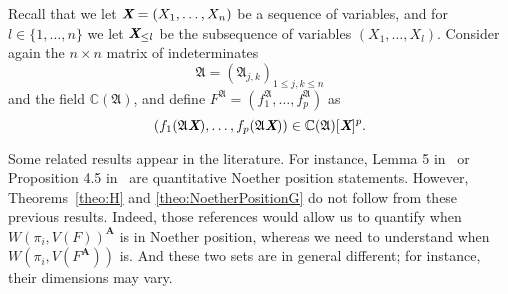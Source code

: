 \documentclass[12pt]{article}
\def\fA{{\mathfrak A}}
\def\A{\mathfrak{A}}
\def\Lb{\textit{\textbf{L}}}
\def\Xb{\textit{\textbf{X}}}
\def\mA{{\bm A}}
\def\ub{{\bm u}}
\def\xb{{\bm x}}
\DeclareMathOperator{\jac}{jac}
\def\minorsfA{\textrm{Minors}(F^{\A},p)}
\def\C{\mathbb{C}}
\def\I{\mathfrak{I}}
\def\Il{\mathscr{I}_{\ub}}
\def\IilfA{\mathscr{I}_{\ub}(i,F^{\A})}
\def\WilfA{\mathscr{W}_{\ub}(\pi_i,V^{\fA})}
\def\Wl{\mathscr{W}_{\ub}}
\begin{document}
Recall that we let $\Xb = (X_1, \hdots , X_n)$ be a sequence of variables, and for $l \in \{1,\hdots,n\}$ we let $\Xb_{\leq l}$ be the subsequence of variables $(X_1, \hdots , X_l)$. Consider again the $n\times n$ matrix of indeterminates
\[\A=(\A_{j,k})_{1 \le j,k \le n}\] and the field $\C(\A)$,
and define $F^{\A}=(f_1^{\A},\hdots,f_p^{\A})$  as \[(f_1(\A\Xb),\hdots,f_p(\A\Xb)) \in \C(\A)[\Xb]^p.\]  



Some related results appear in the literature. For instance, Lemma 5
in~\cite{JeSa10} or Proposition 4.5
in~\cite{SharpEstimatesForTheEffectiveN} are quantitative Noether
position statements. However, Theorems~\ref{theo:H} and
\ref{theo:NoetherPositionG} do not follow from these previous
results. Indeed, those references would allow us to quantify when
$W(\pi_i,V(F))^\mA$ is in Noether position, whereas we need to
understand when $W(\pi_i,V(F^\mA))$ is. And these two sets are in
general different; for instance, their dimensions may vary.

\end{document}
